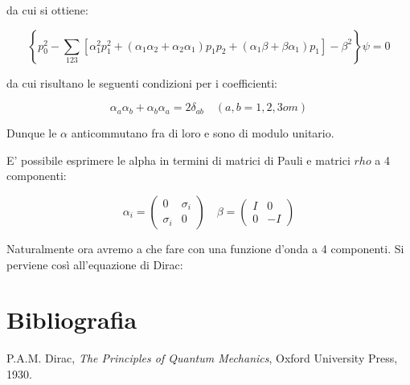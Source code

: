 \documentclass{article}
\begin{document}
da cui si ottiene:

\begin{equation}
    \left\{p_0^2-\sum_{123}[\alpha_1^2p_1^2+(\alpha_1\alpha_2+\alpha_2\alpha_1)p_1p_2+(\alpha_1\beta+\beta\alpha_1)p_1]-\beta^2\right\}\psi=0
\end{equation}

da cui risultano le seguenti condizioni per i coefficienti:

\begin{equation}
    \alpha_a\alpha_b+\alpha_b\alpha_a=2\delta_{ab} \quad (a,b=1,2,3 o m)
\end{equation}

Dunque le $\alpha$ anticommutano fra di loro e sono di modulo unitario.

E' possibile esprimere le alpha in termini di matrici di Pauli e matrici $rho$ a 4 componenti:

\begin{equation}
    \alpha_i=\begin{pmatrix}
        0        & \sigma_i \\
        \sigma_i & 0
    \end{pmatrix}
    \quad
    \beta=\begin{pmatrix}
        I & 0  \\
        0 & -I
    \end{pmatrix}
\end{equation}

Naturalmente ora avremo a che fare con una funzione d'onda a 4 componenti.
Si perviene così all'equazione di Dirac:



\section{Bibliografia}
\begin{thebibliography}{9}
     P.A.M. Dirac, \emph{The Principles of Quantum Mechanics}, Oxford University Press, 1930.
\end{thebibliography}
\end{document}
